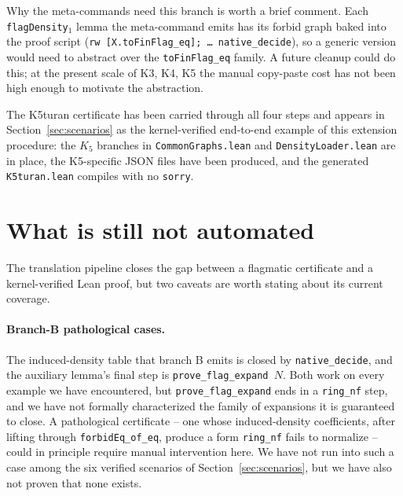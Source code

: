 \documentclass[11pt]{article}
\begin{document}
Why the meta-commands need this branch is worth a brief comment. Each
\texttt{flagDensity}$_1$ lemma the meta-command emits has its forbid
graph baked into the proof script (\texttt{rw [X.toFinFlag\_eq]; \ldots
native\_decide}), so a generic version would need to abstract over the
\texttt{toFinFlag\_eq} family. A future cleanup could do this; at the
present scale of K3, K4, K5 the manual copy-paste cost has not been
high enough to motivate the abstraction.

The K5turan certificate has been carried through all four steps and
appears in Section~\ref{sec:scenarios} as the kernel-verified end-to-end
example of this extension procedure: the $K_5$ branches in
\texttt{CommonGraphs.lean} and \texttt{DensityLoader.lean} are in place,
the K5-specific JSON files have been produced, and the generated
\texttt{K5turan.lean} compiles with no \texttt{sorry}.

\section{What is still not automated}

The translation pipeline closes the gap between a flagmatic
certificate and a kernel-verified Lean proof, but two caveats are worth
stating about its current coverage.

\paragraph{Branch-B pathological cases.}
The induced-density table that branch B emits is closed by
\texttt{native\_decide}, and the auxiliary lemma's final step is
\texttt{prove\_flag\_expand $N$}. Both work on every example we have
encountered, but \texttt{prove\_flag\_expand} ends in a
\texttt{ring\_nf} step, and we have not formally characterized the
family of expansions it is guaranteed to close. A pathological
certificate -- one whose induced-density coefficients, after lifting
through \texttt{forbidEq\_of\_eq}, produce a form
\texttt{ring\_nf} fails to normalize -- could in principle require
manual intervention here. We have not run into such a case among the
six verified scenarios of Section~\ref{sec:scenarios}, but we have
also not proven that none exists.
\end{document}
